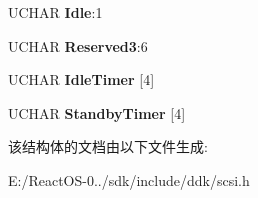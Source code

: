\begin{DoxyCompactItemize}
U\+C\+H\+AR {\bfseries Idle}\+:1
\item 
\mbox{\label{struct___p_o_w_e_r___c_o_n_d_i_t_i_o_n___p_a_g_e_a193bb34e001cfd0bb5206d347b9c9dd0}} 
U\+C\+H\+AR {\bfseries Reserved3}\+:6
\item 
\mbox{\label{struct___p_o_w_e_r___c_o_n_d_i_t_i_o_n___p_a_g_e_adff17abcb8dd2733e8684cb930cd3519}} 
U\+C\+H\+AR {\bfseries Idle\+Timer} \mbox{[}4\mbox{]}
\item 
\mbox{\label{struct___p_o_w_e_r___c_o_n_d_i_t_i_o_n___p_a_g_e_a946cd7e57ad79333103191ce6c905f03}} 
U\+C\+H\+AR {\bfseries Standby\+Timer} \mbox{[}4\mbox{]}
\end{DoxyCompactItemize}


该结构体的文档由以下文件生成\+:\begin{DoxyCompactItemize}
\item 
E\+:/\+React\+O\+S-\/0../sdk/include/ddk/scsi.\+h\end{DoxyCompactItemize}
